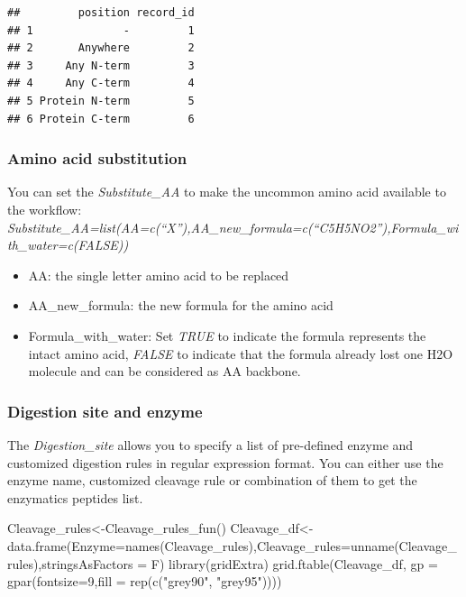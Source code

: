 \documentclass[
]{article}
\newenvironment{Shaded}{\begin{snugshade}}{\end{snugshade}}
\newcommand{\AttributeTok}[1]{\textcolor[rgb]{0.77,0.63,0.00}{#1}}
\newcommand{\DecValTok}[1]{\textcolor[rgb]{0.00,0.00,0.81}{#1}}
\newcommand{\FunctionTok}[1]{\textcolor[rgb]{0.00,0.00,0.00}{#1}}
\newcommand{\NormalTok}[1]{#1}
\newcommand{\OtherTok}[1]{\textcolor[rgb]{0.56,0.35,0.01}{#1}}
\newcommand{\StringTok}[1]{\textcolor[rgb]{0.31,0.60,0.02}{#1}}
\providecommand{\tightlist}{%
  \setlength{\itemsep}{0pt}\setlength{\parskip}{0pt}}
\begin{document}
\begin{verbatim}
##         position record_id
## 1              -         1
## 2       Anywhere         2
## 3     Any N-term         3
## 4     Any C-term         4
## 5 Protein N-term         5
## 6 Protein C-term         6
\end{verbatim}

\hypertarget{amino-acid-substitution}{%
\subsubsection{Amino acid substitution}\label{amino-acid-substitution}}

You can set the \emph{Substitute\_AA} to make the uncommon amino acid
available to the workflow:
\emph{Substitute\_AA=list(AA=c(``X''),AA\_new\_formula=c(``C5H5NO2''),Formula\_with\_water=c(FALSE))}

\begin{itemize}
\tightlist
\item
  AA: the single letter amino acid to be replaced
\item
  AA\_new\_formula: the new formula for the amino acid
\item
  Formula\_with\_water: Set \emph{TRUE} to indicate the formula
  represents the intact amino acid, \emph{FALSE} to indicate that the
  formula already lost one H2O molecule and can be considered as AA
  backbone.
\end{itemize}

\hypertarget{digestion-site-and-enzyme}{%
\subsubsection{Digestion site and
enzyme}\label{digestion-site-and-enzyme}}

The \emph{Digestion\_site} allows you to specify a list of pre-defined
enzyme and customized digestion rules in regular expression format. You
can either use the enzyme name, customized cleavage rule or combination
of them to get the enzymatics peptides list.

\begin{Shaded}
\begin{Highlighting}[]
\NormalTok{Cleavage\_rules}\OtherTok{\textless{}{-}}\FunctionTok{Cleavage\_rules\_fun}\NormalTok{()}
\NormalTok{Cleavage\_df}\OtherTok{\textless{}{-}}\FunctionTok{data.frame}\NormalTok{(}\AttributeTok{Enzyme=}\FunctionTok{names}\NormalTok{(Cleavage\_rules),}\AttributeTok{Cleavage\_rules=}\FunctionTok{unname}\NormalTok{(Cleavage\_rules),}\AttributeTok{stringsAsFactors =}\NormalTok{ F)}
\FunctionTok{library}\NormalTok{(gridExtra)}
\FunctionTok{grid.ftable}\NormalTok{(Cleavage\_df, }\AttributeTok{gp =} \FunctionTok{gpar}\NormalTok{(}\AttributeTok{fontsize=}\DecValTok{9}\NormalTok{,}\AttributeTok{fill =} \FunctionTok{rep}\NormalTok{(}\FunctionTok{c}\NormalTok{(}\StringTok{"grey90"}\NormalTok{, }\StringTok{"grey95"}\NormalTok{))))}
\end{Highlighting}
\end{Shaded}
\end{document}
